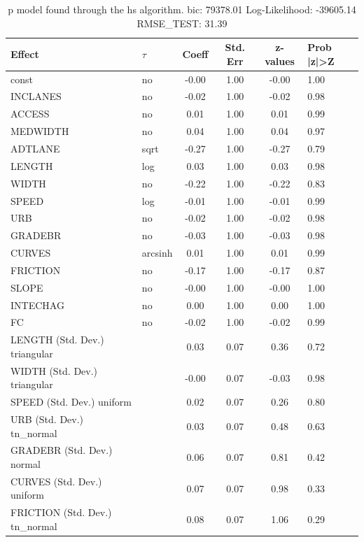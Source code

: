 \begin{table}
	\caption{p model found through the hs algorithm. bic: 79378.01 Log-Likelihood: -39605.14 RMSE_TEST: 31.39}
	\begin{center}
		\begin{tabular}{|l|l|c|c|c|l|}
			\hline
			Effect & $\tau$ & Coeff & Std. Err & z-values & Prob |z|>Z \\
			\hline
			const & no & -0.00 & 1.00 & -0.00 & 1.00 \\
			\hline
			INCLANES & no & -0.02 & 1.00 & -0.02 & 0.98 \\
			\hline
			ACCESS & no & 0.01 & 1.00 & 0.01 & 0.99 \\
			\hline
			MEDWIDTH & no & 0.04 & 1.00 & 0.04 & 0.97 \\
			\hline
			ADTLANE & sqrt & -0.27 & 1.00 & -0.27 & 0.79 \\
			\hline
			LENGTH & log & 0.03 & 1.00 & 0.03 & 0.98 \\
			\hline
			WIDTH & no & -0.22 & 1.00 & -0.22 & 0.83 \\
			\hline
			SPEED & log & -0.01 & 1.00 & -0.01 & 0.99 \\
			\hline
			URB & no & -0.02 & 1.00 & -0.02 & 0.98 \\
			\hline
			GRADEBR & no & -0.03 & 1.00 & -0.03 & 0.98 \\
			\hline
			CURVES & arcsinh & 0.01 & 1.00 & 0.01 & 0.99 \\
			\hline
			FRICTION & no & -0.17 & 1.00 & -0.17 & 0.87 \\
			\hline
			SLOPE & no & -0.00 & 1.00 & -0.00 & 1.00 \\
			\hline
			INTECHAG & no & 0.00 & 1.00 & 0.00 & 1.00 \\
			\hline
			FC & no & -0.02 & 1.00 & -0.02 & 0.99 \\
			\hline
			LENGTH (Std. Dev.) triangular &  & 0.03 & 0.07 & 0.36 & 0.72 \\
			\hline
			WIDTH (Std. Dev.) triangular &  & -0.00 & 0.07 & -0.03 & 0.98 \\
			\hline
			SPEED (Std. Dev.) uniform &  & 0.02 & 0.07 & 0.26 & 0.80 \\
			\hline
			URB (Std. Dev.) tn_normal &  & 0.03 & 0.07 & 0.48 & 0.63 \\
			\hline
			GRADEBR (Std. Dev.) normal &  & 0.06 & 0.07 & 0.81 & 0.42 \\
			\hline
			CURVES (Std. Dev.) uniform &  & 0.07 & 0.07 & 0.98 & 0.33 \\
			\hline
			FRICTION (Std. Dev.) tn_normal &  & 0.08 & 0.07 & 1.06 & 0.29 \\

\end{tabular}
\end{center}
\end{table}
